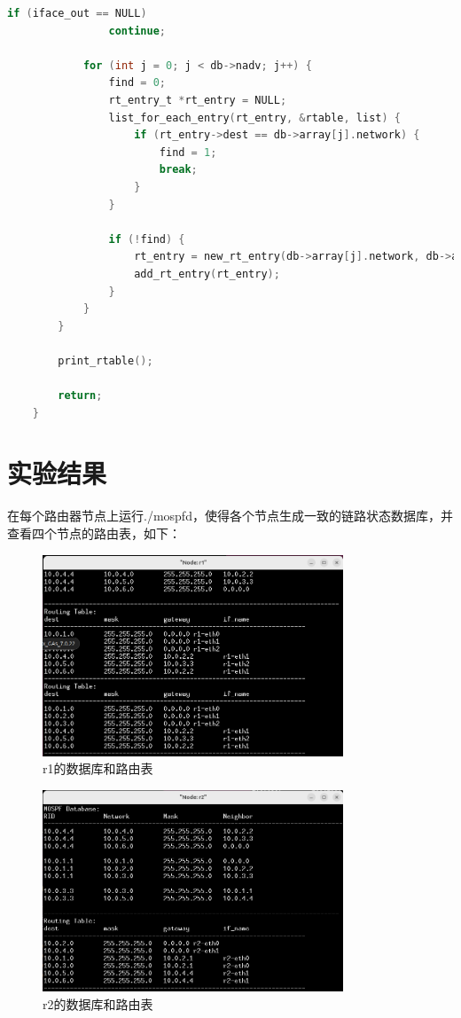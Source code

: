 \documentclass[UTF8]{report}
\begin{document}
\begin{lstlisting}[language=C]
            if (iface_out == NULL)
                continue;
    
            for (int j = 0; j < db->nadv; j++) {
                find = 0;
                rt_entry_t *rt_entry = NULL;
                list_for_each_entry(rt_entry, &rtable, list) {
                    if (rt_entry->dest == db->array[j].network) {
                        find = 1;
                        break;
                    }
                }
    
                if (!find) {
                    rt_entry = new_rt_entry(db->array[j].network, db->array[j].mask, gw, iface_out);
                    add_rt_entry(rt_entry);
                }
            }
        }
    
        print_rtable();
    
        return;
    }
\end{lstlisting}

\section{实验结果}

在每个路由器节点上运行./mospfd，使得各个节点生成一致的链路状态数据库，并查看四个节点的路由表，如下：

\begin{figure}[H]
    \centering
    \includegraphics[width=0.8\textwidth]{r1table.png}
    \caption{r1的数据库和路由表}
\end{figure}

\begin{figure}[H]
    \centering
    \includegraphics[width=0.8\textwidth]{r2table.png}
    \caption{r2的数据库和路由表}
\end{figure}
\end{document}
